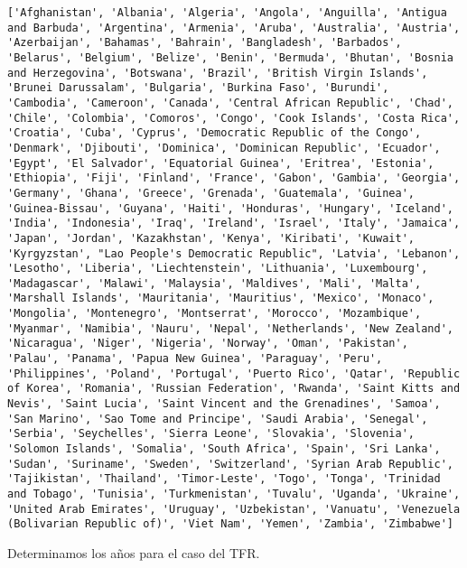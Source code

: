 \documentclass[
  letterpaper,
  DIV=11,
  numbers=noendperiod]{scrreprt}
\begin{document}
\begin{verbatim}
['Afghanistan', 'Albania', 'Algeria', 'Angola', 'Anguilla', 'Antigua and Barbuda', 'Argentina', 'Armenia', 'Aruba', 'Australia', 'Austria', 'Azerbaijan', 'Bahamas', 'Bahrain', 'Bangladesh', 'Barbados', 'Belarus', 'Belgium', 'Belize', 'Benin', 'Bermuda', 'Bhutan', 'Bosnia and Herzegovina', 'Botswana', 'Brazil', 'British Virgin Islands', 'Brunei Darussalam', 'Bulgaria', 'Burkina Faso', 'Burundi', 'Cambodia', 'Cameroon', 'Canada', 'Central African Republic', 'Chad', 'Chile', 'Colombia', 'Comoros', 'Congo', 'Cook Islands', 'Costa Rica', 'Croatia', 'Cuba', 'Cyprus', 'Democratic Republic of the Congo', 'Denmark', 'Djibouti', 'Dominica', 'Dominican Republic', 'Ecuador', 'Egypt', 'El Salvador', 'Equatorial Guinea', 'Eritrea', 'Estonia', 'Ethiopia', 'Fiji', 'Finland', 'France', 'Gabon', 'Gambia', 'Georgia', 'Germany', 'Ghana', 'Greece', 'Grenada', 'Guatemala', 'Guinea', 'Guinea-Bissau', 'Guyana', 'Haiti', 'Honduras', 'Hungary', 'Iceland', 'India', 'Indonesia', 'Iraq', 'Ireland', 'Israel', 'Italy', 'Jamaica', 'Japan', 'Jordan', 'Kazakhstan', 'Kenya', 'Kiribati', 'Kuwait', 'Kyrgyzstan', "Lao People's Democratic Republic", 'Latvia', 'Lebanon', 'Lesotho', 'Liberia', 'Liechtenstein', 'Lithuania', 'Luxembourg', 'Madagascar', 'Malawi', 'Malaysia', 'Maldives', 'Mali', 'Malta', 'Marshall Islands', 'Mauritania', 'Mauritius', 'Mexico', 'Monaco', 'Mongolia', 'Montenegro', 'Montserrat', 'Morocco', 'Mozambique', 'Myanmar', 'Namibia', 'Nauru', 'Nepal', 'Netherlands', 'New Zealand', 'Nicaragua', 'Niger', 'Nigeria', 'Norway', 'Oman', 'Pakistan', 'Palau', 'Panama', 'Papua New Guinea', 'Paraguay', 'Peru', 'Philippines', 'Poland', 'Portugal', 'Puerto Rico', 'Qatar', 'Republic of Korea', 'Romania', 'Russian Federation', 'Rwanda', 'Saint Kitts and Nevis', 'Saint Lucia', 'Saint Vincent and the Grenadines', 'Samoa', 'San Marino', 'Sao Tome and Principe', 'Saudi Arabia', 'Senegal', 'Serbia', 'Seychelles', 'Sierra Leone', 'Slovakia', 'Slovenia', 'Solomon Islands', 'Somalia', 'South Africa', 'Spain', 'Sri Lanka', 'Sudan', 'Suriname', 'Sweden', 'Switzerland', 'Syrian Arab Republic', 'Tajikistan', 'Thailand', 'Timor-Leste', 'Togo', 'Tonga', 'Trinidad and Tobago', 'Tunisia', 'Turkmenistan', 'Tuvalu', 'Uganda', 'Ukraine', 'United Arab Emirates', 'Uruguay', 'Uzbekistan', 'Vanuatu', 'Venezuela (Bolivarian Republic of)', 'Viet Nam', 'Yemen', 'Zambia', 'Zimbabwe']
\end{verbatim}

Determinamos los años para el caso del TFR.
\end{document}
